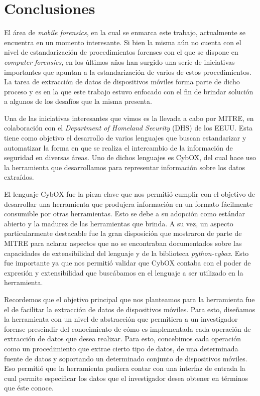 \chapter{Conclusiones} \label{chap:Conclusiones}
El área de \emph{mobile forensics}, en la cual se enmarca este trabajo, actualmente se encuentra en un momento interesante. Si bien la misma aún no cuenta con el nivel de estandarización de procedimientos forenses con el que se dispone en \emph{computer forensics}, en los últimos años han surgido una serie de iniciativas importantes que apuntan a la estandarización de varios de estos procedimientos. La tarea de extracción de datos de dispositivos móviles forma parte de dicho proceso y es en la que este trabajo estuvo enfocado con el fin de brindar solución a algunos de los desafíos que la misma presenta.

Una de las iniciativas interesantes que vimos es la llevada a cabo por MITRE, en colaboración con el \emph{Department of Homeland Security} (DHS) de los EEUU. Esta tiene como objetivo el desarrollo de varios lenguajes que buscan estandarizar y automatizar la forma en que se realiza el intercambio de la información de seguridad en diversas áreas. Uno de dichos lenguajes es CybOX, del cual hace uso la herramienta que desarrollamos para representar información sobre los datos extraídos.

El lenguaje CybOX fue la pieza clave que nos permitió cumplir con el objetivo de desarrollar una herramienta que produjera información en un formato fácilmente consumible por otras herramientas. Esto se debe a su adopción como estándar abierto y la madurez de las herramientas que brinda. A su vez, un aspecto particularmente destacable fue la gran disposición que mostraron de parte de MITRE para aclarar aspectos que no se encontraban documentados sobre las capacidades de extensibilidad del lenguaje y de la biblioteca \emph{python-cybox}. Esto fue importante ya que nos permitió validar que CybOX contaba con el poder de expresión y extensibilidad que buscábamos en el lenguaje a ser utilizado en la herramienta.

Recordemos que el objetivo principal que nos planteamos para la herramienta fue el de facilitar la extracción de datos de dispositivos móviles. Para esto, diseñamos la herramienta con un nivel de abstracción que permitiera a un investigador forense prescindir del conocimiento de cómo es implementada cada operación de extracción de datos que desea realizar. Para esto, concebimos cada operación como un procedimiento que extrae cierto tipo de datos, de una determinada fuente de datos y soportando un determinado conjunto de dispositivos móviles. Eso permitió que la herramienta pudiera contar con una interfaz de entrada la cual permite especificar los datos que el investigador desea obtener en términos que éste conoce.

